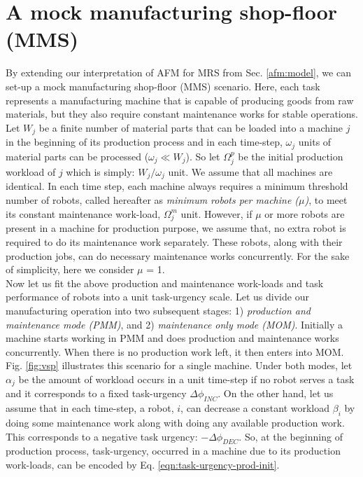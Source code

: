 \section{A mock manufacturing shop-floor (MMS)}
\label{afm:vms}
By extending our interpretation of AFM for MRS from Sec. \ref{afm:model}, we can set-up a mock manufacturing shop-floor (MMS) scenario. Here, each task represents a manufacturing machine that is  capable of producing goods from raw materials, but they also require constant maintenance works for stable operations. Let $W_{j}$ be a finite number of material parts that can be loaded into a machine $j$ in the beginning of its production process and in each time-step, $\omega_{j}$ units of material parts can be processed  ($\omega_{j} \ll W_{j} $). So let $\Omega_{j}^{p}$ be the initial production workload of $j$ which is simply: $W_{j} / \omega_{j}$ unit. We assume that all machines are identical. In each time step, each machine always requires a minimum threshold number of robots, called hereafter as {\em minimum robots per machine ($\mu$)}, to meet its constant maintenance work-load, $\Omega_{j}^{m}$ unit. However, if $\mu$ or more robots are present in a machine for production purpose, we assume that, no extra robot is required to do its maintenance work separately. These robots, along with their production jobs, can do necessary maintenance works concurrently. For the sake of simplicity, here we consider $\mu$ = 1.\\
Now let us fit the above production and maintenance work-loads and task performance of robots into a unit task-urgency scale. Let us divide our manufacturing operation into two subsequent stages: 1) {\em production and maintenance mode (PMM)}, and 2) {\em maintenance only mode (MOM)}. Initially a machine starts working in PMM and does production and maintenance works concurrently. When there is no production work left, it then enters into MOM. Fig. \ref{fig:vsp} illustrates this scenario for a single machine.
Under both modes, let $\alpha_{j}$ be the amount of workload occurs in a unit time-step if no robot serves a task and it corresponds to a fixed task-urgency $\Delta \phi_{INC}$. On the other hand, let us assume that in each time-step, a robot, $i$, can decrease a constant workload $\beta_{i}$ by doing some maintenance work along with doing any available production work. This  corresponds to a negative task urgency: $- \Delta \phi_{DEC}$. 
So, at the beginning of production process, task-urgency, occurred in a machine due to its production work-loads, can be encoded by Eq. \ref{eqn:task-urgency-prod-init}.
